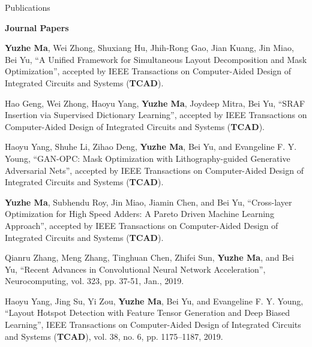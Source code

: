 \begin{rSection}{Publications}

\iffalse
\textbf{Books / Book Chapters}
\begin{description}[font=\normalfont]

\end{description}
\fi

\textbf{Journal Papers}
\begin{description}[font=\normalfont]
\iffalse
\item \textbf{Submitted}

\fi


\item[{[J7]}]{
        \textbf{Yuzhe Ma}, Wei Zhong, Shuxiang Hu, Jhih-Rong Gao, Jian Kuang, Jin Miao, Bei Yu, 
        ``A Unified Framework for Simultaneous Layout Decomposition and Mask Optimization'', 
        accepted by IEEE Transactions on Computer-Aided Design of Integrated Circuits and Systems (\textbf{TCAD}).
}

\item[{[J6]}]{
    Hao Geng, Wei Zhong, Haoyu Yang, \textbf{Yuzhe Ma}, Joydeep Mitra, Bei Yu, 
        ``SRAF Insertion via Supervised Dictionary Learning'', 
        accepted by IEEE Transactions on Computer-Aided Design of Integrated Circuits and Systems (\textbf{TCAD}).
}

\item[{[J5]}]{
    Haoyu Yang, Shuhe Li, Zihao Deng, \textbf{Yuzhe Ma}, Bei Yu, and Evangeline F. Y. Young, 
    ``GAN-OPC: Mask Optimization with Lithography-guided Generative Adversarial Nets'',
    accepted by IEEE Transactions on Computer-Aided Design of Integrated Circuits and Systems (\textbf{TCAD}).
}

\item[{[J4]}]{
	\textbf{Yuzhe Ma}, Subhendu Roy, Jin Miao, Jiamin Chen, and Bei Yu,
	``Cross-layer Optimization for High Speed Adders: A Pareto Driven Machine Learning Approach'', 
	accepted by IEEE Transactions on Computer-Aided Design of Integrated Circuits and Systems (\textbf{TCAD}).
}

\item[{[J3]}]{
	Qianru Zhang, Meng Zhang, Tinghuan Chen, Zhifei Sun, \textbf{Yuzhe Ma}, and Bei Yu,
	``Recent Advances in Convolutional Neural Network Acceleration'', 
	Neurocomputing, vol. 323, pp. 37-51, Jan., 2019.
}

\item[{[J2]}]{
	Haoyu Yang, Jing Su, Yi Zou, \textbf{Yuzhe Ma}, Bei Yu, and Evangeline F. Y. Young, 
	``Layout Hotspot Detection with Feature Tensor Generation and Deep Biased Learning'', 
	IEEE Transactions on Computer-Aided Design of Integrated Circuits and Systems (\textbf{TCAD}), vol. 38, no. 6, pp. 1175--1187, 2019.
}


\end{description}
\end{rSection}
